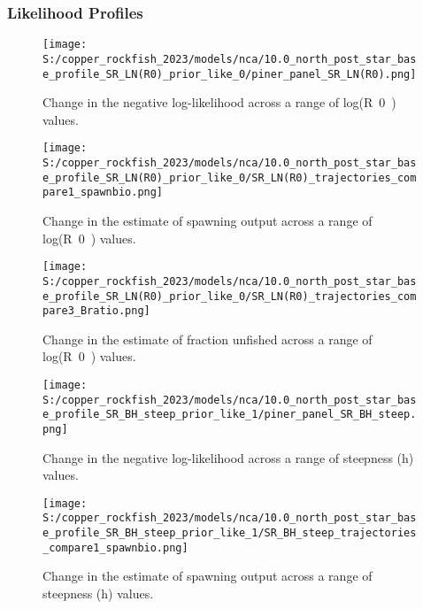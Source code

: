 \documentclass[11pt,
  letterpaper,
]{article}
\begin{document}
\pagebreak

\subsubsection{Likelihood Profiles}\label{likelihood-profiles-1}

\begin{figure}
{\centering
\texttt{[image: S:/copper\_rockfish\_2023/models/nca/10.0\_north\_post\_star\_base\_profile\_SR\_LN(R0)\_prior\_like\_0/piner\_panel\_SR\_LN(R0).png]}
}
\caption{Change in the negative log-likelihood across a range of log(R~0~) values.\label{fig:r0-profile}}
\end{figure}

\pagebreak

\begin{figure}
{\centering
\texttt{[image: S:/copper\_rockfish\_2023/models/nca/10.0\_north\_post\_star\_base\_profile\_SR\_LN(R0)\_prior\_like\_0/SR\_LN(R0)\_trajectories\_compare1\_spawnbio.png]}
}
\caption{Change in the estimate of spawning output across a range of log(R~0~) values.\label{fig:r0-ssb}}
\end{figure}

\pagebreak

\begin{figure}
{\centering
\texttt{[image: S:/copper\_rockfish\_2023/models/nca/10.0\_north\_post\_star\_base\_profile\_SR\_LN(R0)\_prior\_like\_0/SR\_LN(R0)\_trajectories\_compare3\_Bratio.png]}
}
\caption{Change in the estimate of fraction unfished across a range of log(R~0~) values.\label{fig:r0-depl}}
\end{figure}

\pagebreak

\begin{figure}
{\centering
\texttt{[image: S:/copper\_rockfish\_2023/models/nca/10.0\_north\_post\_star\_base\_profile\_SR\_BH\_steep\_prior\_like\_1/piner\_panel\_SR\_BH\_steep.png]}
}
\caption{Change in the negative log-likelihood across a range of steepness (h) values.\label{fig:h-profile}}
\end{figure}

\pagebreak

\begin{figure}
{\centering
\texttt{[image: S:/copper\_rockfish\_2023/models/nca/10.0\_north\_post\_star\_base\_profile\_SR\_BH\_steep\_prior\_like\_1/SR\_BH\_steep\_trajectories\_compare1\_spawnbio.png]}
}
\caption{Change in the estimate of spawning output across a range of steepness (h) values.\label{fig:h-ssb}}
\end{figure}
\end{document}

